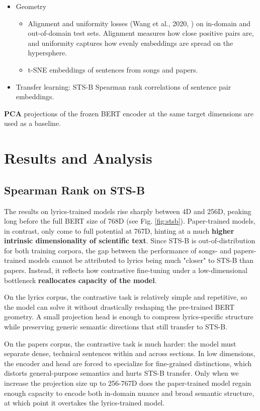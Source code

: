 \documentclass{article}
\begin{document}
\begin{itemize}
\item Geometry
\begin{itemize}
		\item Alignment and uniformity losses (Wang et al., 2020, \cite{wang2020contrastive}) on in-domain
				and out-of-domain test sets. Alignment measures how close positive pairs are, and
				uniformity captures how evenly embeddings are spread on the hypersphere.
		\item t-SNE embeddings of sentences from songs and papers.
\end{itemize}
\item Transfer learning: STS-B Spearman rank correlations of sentence pair embeddings.
\end{itemize}

\textbf{PCA} projections of the frozen BERT encoder at the same target dimensions are
used as a baseline.

\section{Results and Analysis}

\subsection{Spearman Rank on STS-B}
The results on lyrics-trained models rise sharply between 4D and 256D, peaking long
before the full BERT size of 768D (see Fig. \ref{fig:stsb}). Paper-trained models, in
contrast, only come to full potential at 767D, hinting at a much \textbf{higher intrinsic
dimensionality of scientific text}. Since STS-B is out-of-distribution for both training
corpora, the gap between the performance of songs- and papers-trained models cannot be
attributed to lyrics being much "closer" to STS-B than papers. Instead, it reflects how
contrastive fine-tuning under a low-dimensional bottleneck \textbf{reallocates capacity
of the model}.

On the lyrics corpus, the contrastive task is relatively simple and repetitive, so the
model can solve it without drastically reshaping the pre-trained BERT geometry. A small
projection head is enough to compress lyrics-specific structure while preserving generic
semantic directions that still transfer to STS-B.

On the papers corpus, the contrastive task is much harder: the model must separate dense,
technical sentences within and across sections. In low dimensions, the encoder and head
are forced to specialize for fine-grained distinctions, which distorts general-purpose
semantics and hurts STS-B transfer. Only when we increase the projection size up to
256-767D does the paper-trained model regain enough capacity to encode both in-domain
nuance and broad semantic structure, at which point it overtakes the lyrics-trained model.
\end{document}
